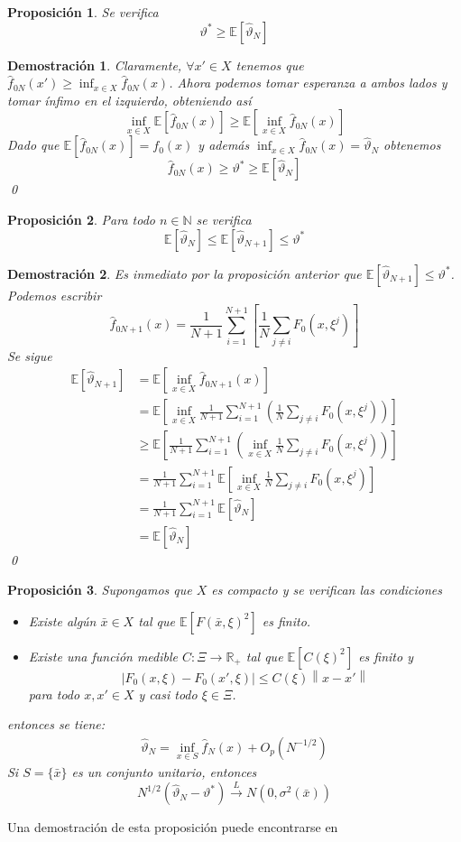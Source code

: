 \documentclass[twoside,a4paper,openright,12pt]{book}
\newtheorem{prop}{Proposici\'on}[section]
\newtheorem*{dem}{Demostración}
\providecommand{\abs}[1]{\left|{#1}\right|}
\providecommand{\conv}[1]{\overset{#1}{\longrightarrow}}
\providecommand{\func}[2]{\colon{#1}\longrightarrow{#2}}
\newcommand{\R}{\mathbb{R}}
\newcommand{\N}{\mathbb{N}}
\newcommand{\E}{\mathbb{E}}
\providecommand{\norm}[1]{\left\lVert#1\right\rVert}
\newcommand{\va}{\hat{\vartheta}_N}
\begin{document}
\begin{prop}
Se verifica 
$$
\vartheta^* \geq \E[\va]
$$
\end{prop}
\begin{dem}
Claramente, $\forall x' \in X$ tenemos que $\hat{f}_{0N}(x')\geq \inf_{x\in X} \hat{f}_{0N}(x)$. Ahora podemos tomar esperanza a ambos lados y tomar ínfimo en el izquierdo, obteniendo así
$$
\inf_{x\in X}\E\left[\hat{f}_{0N}(x)\right]\geq \E\left[\inf_{x\in X}\hat{f}_{0N}(x)\right]
$$
Dado que $\E[\hat{f}_{0N}(x)]=f_0(x)$ y además $\inf_{x\in X}\hat{f}_{0N}(x)=\va$ obtenemos 
$$
\hat{f}_{0N}(x) \geq \vartheta^* \geq \E[\va]
$$\qed
\end{dem}
\begin{prop}
Para todo $n\in \N$ se verifica
$$
\E[\va]\leq \E[\hat{\vartheta}_{N+1}]\leq \vartheta^*
$$
\end{prop}
\begin{dem}
Es inmediato por la proposición anterior que $\E[\hat{\vartheta}_{N+1}]\leq \vartheta^*$. Podemos escribir
$$
\hat{f}_{0N+1}(x)=\frac{1}{N+1}\sum_{i=1}^{N+1}\left[\frac{1}{N}\sum_{j\neq i} F_0(x,\xi^j)\right]
$$
Se sigue 
\begin{align*}
\E[\hat{\vartheta}_{N+1}] &= \E\left[\inf_{x\in X}\hat{f}_{0N+1}(x)\right]\\
&=\E\left[\inf_{x\in X}\frac{1}{N+1}\sum_{i=1}^{N+1}\left(\frac{1}{N}\sum_{j\neq i} F_0(x,\xi^j)\right)\right]\\
&\geq \E\left[\frac{1}{N+1}\sum_{i=1}^{N+1}\left(\inf_{x\in X}\frac{1}{N}\sum_{j\neq i} F_0(x,\xi^j)\right)\right]\\
&=\frac{1}{N+1}\sum_{i=1}^{N+1}\E\left[\inf_{x\in X}\frac{1}{N}\sum_{j\neq i} F_0(x,\xi^j)\right]\\
&=\frac{1}{N+1}\sum_{i=1}^{N+1}\E[\va]\\
&=\E[\va]
\end{align*}\qed
\end{dem}
\newpage
\begin{prop}
Supongamos que $X$ es compacto y se verifican las condiciones
\begin{itemize}
\item[(A1)] Existe algún $\bar{x}\in X$ tal que $\E[F(\bar{x},\xi)^2]$ es finito.
\item[(A2)] Existe una función medible $C\func{\Xi}{\R_+}$ tal que $\E[C(\xi)^2]$ es finito y 
$$\abs{F_0(x,\xi)-F_0(x',\xi)}\leq C(\xi)\norm{x-x'}
$$
para todo $x,x'\in X$ y casi todo $\xi\in\Xi$.
\end{itemize}
entonces se tiene:
\begin{gather*}
\va=\inf_{x\in S}\hat{f}_N(x)+O_p(N^{-1/2})
\end{gather*}
Si $S=\{\bar{x}\}$ es un conjunto unitario, entonces
$$
N^{1/2}\left(\va-\vartheta^*\right)\conv{L} N(0,\sigma^2(\bar{x}))
$$
\end{prop}
Una demostración de esta proposición puede encontrarse en \cite{lecture}
\end{document}

